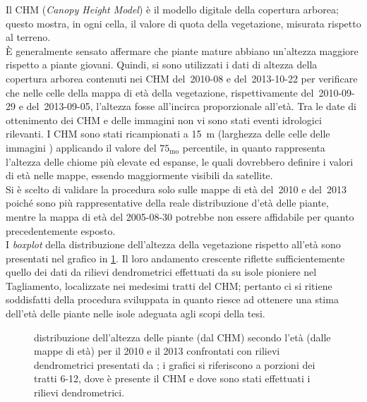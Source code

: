 Il CHM (\emph{Canopy Height Model}) è il modello digitale della copertura arborea; questo mostra, in ogni cella, il valore di quota della vegetazione, misurata rispetto al terreno.
\\
È generalmente sensato affermare che piante mature abbiano un'altezza maggiore rispetto a piante giovani.
Quindi, si sono utilizzati i dati di altezza della copertura arborea contenuti nei CHM del~2010-08 e del~2013-10-22 per verificare che nelle celle della mappa di età della vegetazione, rispettivamente del~2010-09-29 e del~2013-09-05, l'altezza fosse all'incirca proporzionale all'età.
Tra le date di ottenimento dei CHM e delle immagini \AST{} non vi sono stati eventi idrologici rilevanti.
I CHM sono stati ricampionati a \SI{15}{\m} (larghezza delle celle delle immagini \AST{}) applicando il valore del $75_{\mathrm{mo}}$ percentile, in quanto rappresenta l'altezza delle chiome più elevate ed espanse, le quali dovrebbero definire i valori di età nelle mappe, essendo maggiormente visibili da satellite.
\\
Si è scelto di validare la procedura solo sulle mappe di età del~2010 e del~2013 poiché sono più rappresentative della reale distribuzione d'età delle piante, mentre la mappa di età del 2005-08-30 potrebbe non essere affidabile per quanto precedentemente esposto.
\\
I \emph{boxplot} della distribuzione dell'altezza della vegetazione rispetto all'età sono presentati nel grafico in \cref{graph:altezza-chm-eta}.
Il loro andamento crescente riflette sufficientemente quello dei dati da rilievi dendrometrici effettuati da  su isole pioniere nel Tagliamento, localizzate nei medesimi tratti del CHM; pertanto ci si ritiene soddisfatti della procedura sviluppata in quanto riesce ad ottenere una stima dell'età delle piante nelle isole adeguata agli scopi della tesi.
%
\begin{figure}
	\centering
	
	\caption[distribuzione dell'altezza delle piante secondo l'età]{distribuzione dell'altezza delle piante (dal CHM) secondo l'età (dalle mappe di età) per il 2010 e il 2013 confrontati con rilievi dendrometrici presentati da ; i grafici si riferiscono a porzioni dei tratti 6-12, dove è presente il CHM e dove sono stati effettuati i rilievi dendrometrici.}
	\label{graph:altezza-chm-eta}
\end{figure}
%


